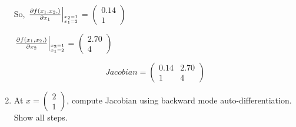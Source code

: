 \documentclass[12pt]{article}
\begin{document}
\begin{enumerate}[label=(\roman*)]
So,
    \(
    \left. \frac{\partial f(x_1,x_2,)}{\partial x_1} \right|_{%
   \stackon[1pt]{$\scriptscriptstyle x_1=2$}{$\scriptscriptstyle x_2=1$}}
   \)
   = $
   \begin{pmatrix}
   0.14\\1
   \end{pmatrix}$

   \(
    \left. \frac{\partial f(x_1,x_2,)}{\partial x_2} \right|_{%
   \stackon[1pt]{$\scriptscriptstyle x_1=2$}{$\scriptscriptstyle x_2=1$}}
   \) = $
   \begin{pmatrix}
   2.70\\ 4
   \end{pmatrix}$


  $$ Jacobian =   
  \begin{pmatrix}
    0.14 & 2.70\\
    1 & 4 
    
    \end{pmatrix}$$

\item At 
$x=
\begin{pmatrix}
2\\1
\end{pmatrix}$, compute Jacobian using backward mode auto-differentiation. Show all steps.\\


\end{enumerate}
\end{document}

